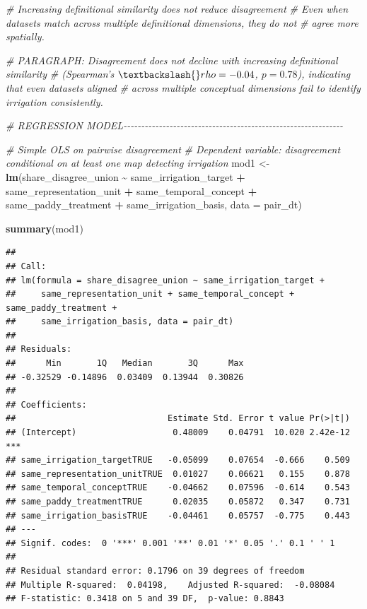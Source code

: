 \documentclass[
  11pt,
]{article}
\newenvironment{Shaded}{\begin{snugshade}}{\end{snugshade}}
\newcommand{\AttributeTok}[1]{\textcolor[rgb]{0.13,0.29,0.53}{#1}}
\newcommand{\CommentTok}[1]{\textcolor[rgb]{0.56,0.35,0.01}{\textit{#1}}}
\newcommand{\FunctionTok}[1]{\textcolor[rgb]{0.13,0.29,0.53}{\textbf{#1}}}
\newcommand{\NormalTok}[1]{#1}
\newcommand{\OtherTok}[1]{\textcolor[rgb]{0.56,0.35,0.01}{#1}}
\newcommand{\SpecialCharTok}[1]{\textcolor[rgb]{0.81,0.36,0.00}{\textbf{#1}}}
\begin{document}
\begin{Shaded}
\begin{Highlighting}[]
\CommentTok{\# Increasing definitional similarity does not reduce disagreement}
\CommentTok{\# Even when datasets match across multiple definitional dimensions, they do not}
\CommentTok{\# agree more spatially.}

\CommentTok{\# PARAGRAPH: Disagreement does not decline with increasing definitional similarity}
\CommentTok{\# (Spearman’s $\textbackslash{}rho = {-}0.04$, $p = 0.78$), indicating that even datasets aligned}
\CommentTok{\# across multiple conceptual dimensions fail to identify irrigation consistently.}

\CommentTok{\# REGRESSION MODEL{-}{-}{-}{-}{-}{-}{-}{-}{-}{-}{-}{-}{-}{-}{-}{-}{-}{-}{-}{-}{-}{-}{-}{-}{-}{-}{-}{-}{-}{-}{-}{-}{-}{-}{-}{-}{-}{-}{-}{-}{-}{-}{-}{-}{-}{-}{-}{-}{-}{-}{-}{-}{-}{-}{-}{-}{-}{-}{-}{-}{-}{-}}

\CommentTok{\# Simple OLS on pairwise disagreement}
\CommentTok{\# Dependent variable: disagreement conditional on at least one map detecting irrigation}
\NormalTok{mod1 }\OtherTok{\textless{}{-}} \FunctionTok{lm}\NormalTok{(share\_disagree\_union }\SpecialCharTok{\textasciitilde{}}
\NormalTok{             same\_irrigation\_target }\SpecialCharTok{+}
\NormalTok{             same\_representation\_unit }\SpecialCharTok{+}
\NormalTok{             same\_temporal\_concept }\SpecialCharTok{+}
\NormalTok{             same\_paddy\_treatment }\SpecialCharTok{+}
\NormalTok{             same\_irrigation\_basis,}
           \AttributeTok{data =}\NormalTok{ pair\_dt)}

\FunctionTok{summary}\NormalTok{(mod1)}
\end{Highlighting}
\end{Shaded}

\begin{verbatim}
## 
## Call:
## lm(formula = share_disagree_union ~ same_irrigation_target + 
##     same_representation_unit + same_temporal_concept + same_paddy_treatment + 
##     same_irrigation_basis, data = pair_dt)
## 
## Residuals:
##      Min       1Q   Median       3Q      Max 
## -0.32529 -0.14896  0.03409  0.13944  0.30826 
## 
## Coefficients:
##                              Estimate Std. Error t value Pr(>|t|)    
## (Intercept)                   0.48009    0.04791  10.020 2.42e-12 ***
## same_irrigation_targetTRUE   -0.05099    0.07654  -0.666    0.509    
## same_representation_unitTRUE  0.01027    0.06621   0.155    0.878    
## same_temporal_conceptTRUE    -0.04662    0.07596  -0.614    0.543    
## same_paddy_treatmentTRUE      0.02035    0.05872   0.347    0.731    
## same_irrigation_basisTRUE    -0.04461    0.05757  -0.775    0.443    
## ---
## Signif. codes:  0 '***' 0.001 '**' 0.01 '*' 0.05 '.' 0.1 ' ' 1
## 
## Residual standard error: 0.1796 on 39 degrees of freedom
## Multiple R-squared:  0.04198,    Adjusted R-squared:  -0.08084 
## F-statistic: 0.3418 on 5 and 39 DF,  p-value: 0.8843
\end{verbatim}
\end{document}
